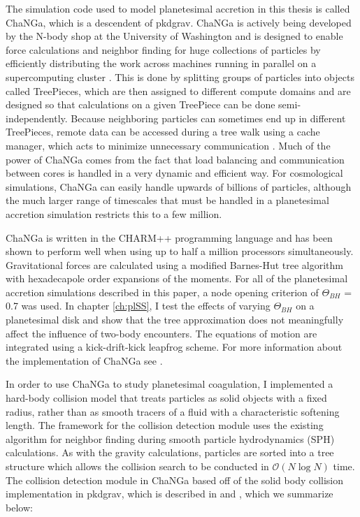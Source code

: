 The simulation code used to model planetesimal accretion in this thesis is called {\sc ChaNGa}, which is a descendent of {\sc pkdgrav}. {\sc ChaNGa} is actively being developed by the N-body shop at the University of Washington and is designed to enable force calculations and neighbor finding for huge collections of particles by efficiently distributing the work across machines running in parallel on a supercomputing cluster \cite{jetley08, menon15}. This is done by splitting groups of particles into objects called TreePieces, which are then assigned to different compute domains and are designed so that calculations on a given TreePiece can be done semi-independently. Because neighboring particles can sometimes end up in different TreePieces, remote data can be accessed during a tree walk using a cache manager, which acts to minimize unnecessary communication \cite{menon15}. Much of the power of {\sc ChaNGa} comes from the fact that load balancing and communication between cores is handled in a very dynamic and efficient way. For cosmological simulations, {\sc ChaNGa} can easily handle upwards of billions of particles, although the much larger range of timescales that must be handled in a planetesimal accretion simulation restricts this to a few million.

{\sc ChaNGa} is written in the {\sc CHARM++} programming language and has been shown to perform well when using up to half a million processors \cite{menon15} simultaneously. Gravitational forces are calculated using a modified Barnes-Hut tree algorithm with hexadecapole order expansions of the moments. For all of the planetesimal accretion simulations described in this paper, a node opening criterion of $\Theta_{BH}$ = 0.7 was used. In chapter \ref{ch:plSS}, I test the effects of varying $\Theta_{BH}$ on a planetesimal disk and show that the tree approximation does not meaningfully affect the influence of two-body encounters. The equations of motion are integrated using a kick-drift-kick leapfrog scheme. For more information about the implementation of {\sc ChaNGa} see \cite{jetley08}.

In order to use {\sc ChaNGa} to study planetesimal coagulation, I implemented a hard-body collision model that treats particles as solid objects with a fixed radius, rather than as smooth tracers of a fluid with a characteristic softening length. The framework for the collision detection module uses the existing algorithm for neighbor finding during smooth particle hydrodynamics (SPH) calculations. As with the gravity calculations, particles are sorted into a tree structure which allows the collision search to be conducted in $\mathcal{O}(N\log{}N)$ time. The collision detection module in {\sc ChaNGa} based off of the solid body collision implementation in {\sc pkdgrav}, which is described in \cite{richardson94} and \cite{richardson00}, which we summarize below:

